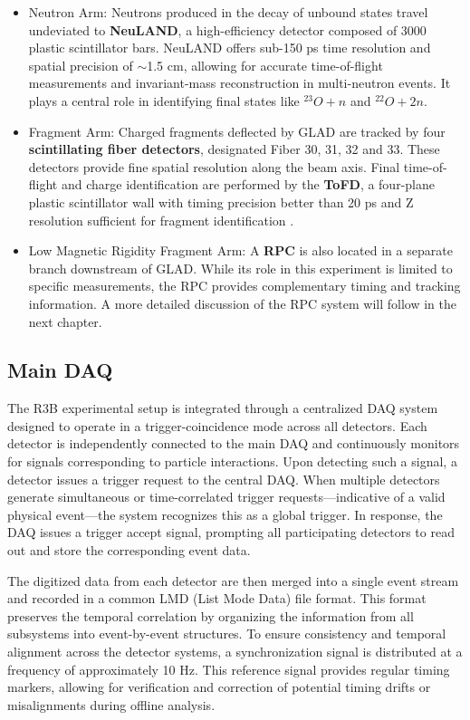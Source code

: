\begin{itemize}
	\item Neutron Arm: Neutrons produced in the decay of unbound states travel undeviated to \textbf{NeuLAND}, a high-efficiency detector composed of 3000 plastic scintillator bars. NeuLAND offers sub-150 ps time resolution and spatial precision of $\sim$1.5 cm, allowing for accurate time-of-flight measurements and invariant-mass reconstruction in multi-neutron events. It plays a central role in identifying final states like $^{23}O + n$ and $^{22}O + 2n$.
	\item Fragment Arm: Charged fragments deflected by GLAD are tracked by four \textbf{scintillating fiber detectors}, designated Fiber 30, 31, 32 and 33. These detectors provide fine spatial resolution along the beam axis. Final time-of-flight and charge identification are performed by the \textbf{\gls{ToFD}}, a four-plane plastic scintillator wall with timing precision better than 20 ps and Z resolution sufficient for fragment identification \cite{heil_new_2022}.
	\item Low Magnetic Rigidity Fragment Arm: A \textbf{\gls{RPC}} is also located in a separate branch downstream of GLAD. While its role in this experiment is limited to specific measurements, the RPC provides complementary timing and tracking information. A more detailed discussion of the RPC system will follow in the next chapter.
\end{itemize}


\subsection{Main DAQ}

The \gls{R3B} experimental setup is integrated through a centralized \gls{DAQ} system designed to operate in a trigger-coincidence mode across all detectors. Each detector is independently connected to the main \gls{DAQ} and continuously monitors for signals corresponding to particle interactions. Upon detecting such a signal, a detector issues a trigger request to the central \gls{DAQ}. When multiple detectors generate simultaneous or time-correlated trigger requests—indicative of a valid physical event—the system recognizes this as a global trigger. In response, the \gls{DAQ} issues a trigger accept signal, prompting all participating detectors to read out and store the corresponding event data.

The digitized data from each detector are then merged into a single event stream and recorded in a common LMD (List Mode Data) file format. This format preserves the temporal correlation by organizing the information from all subsystems into event-by-event structures. To ensure consistency and temporal alignment across the detector systems, a synchronization signal is distributed at a frequency of approximately 10 Hz. This reference signal provides regular timing markers, allowing for verification and correction of potential timing drifts or misalignments during offline analysis.


